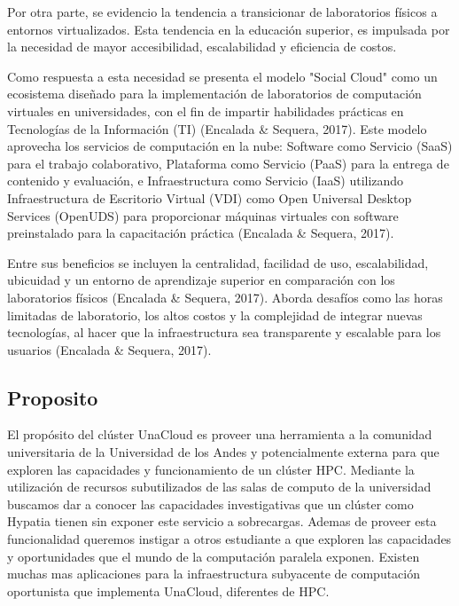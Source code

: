 Por otra parte, se evidencio la tendencia a transicionar de laboratorios físicos a entornos virtualizados. Esta tendencia en la educación superior, es impulsada por la necesidad de mayor accesibilidad, escalabilidad y eficiencia de costos.

Como respuesta a esta necesidad se presenta el modelo "Social Cloud" como un ecosistema diseñado para la implementación de laboratorios de computación virtuales en universidades, con el fin de impartir habilidades prácticas en Tecnologías de la Información (TI) (Encalada & Sequera, 2017). Este modelo aprovecha los servicios de computación en la nube: Software como Servicio (SaaS) para el trabajo colaborativo, Plataforma como Servicio (PaaS) para la entrega de contenido y evaluación, e Infraestructura como Servicio (IaaS) utilizando Infraestructura de Escritorio Virtual (VDI) como Open Universal Desktop Services (OpenUDS) para proporcionar máquinas virtuales con software preinstalado para la capacitación práctica (Encalada & Sequera, 2017). 

Entre sus beneficios se incluyen la centralidad, facilidad de uso, escalabilidad, ubicuidad y un entorno de aprendizaje superior en comparación con los laboratorios físicos (Encalada & Sequera, 2017). Aborda desafíos como las horas limitadas de laboratorio, los altos costos y la complejidad de integrar nuevas tecnologías, al hacer que la infraestructura sea transparente y escalable para los usuarios (Encalada & Sequera, 2017). 

\subsection{Proposito}

El propósito del clúster UnaCloud es proveer una herramienta a la comunidad universitaria de la Universidad de los Andes y potencialmente externa para que exploren las capacidades y funcionamiento de un clúster HPC. Mediante la utilización de recursos subutilizados de las salas de computo de la universidad buscamos dar a conocer las capacidades investigativas que un clúster como Hypatia tienen sin exponer este servicio a sobrecargas. Ademas de proveer esta funcionalidad queremos instigar a otros estudiante a que exploren las capacidades y oportunidades que el mundo de la computación paralela exponen. Existen muchas mas aplicaciones para la infraestructura subyacente de computación oportunista que implementa UnaCloud, diferentes de HPC.
